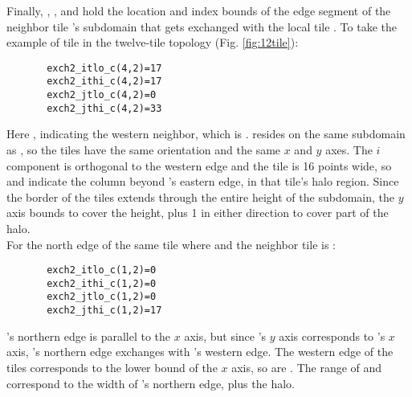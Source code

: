 Finally, ,
,
 and
 hold the location and index
bounds of the edge segment of the neighbor tile 's subdomain
that gets exchanged with the local tile .  To take the example
of tile  in the twelve-tile topology
(Fig. \ref{fig:12tile}): \\

\begin{verbatim}
       exch2_itlo_c(4,2)=17
       exch2_ithi_c(4,2)=17
       exch2_jtlo_c(4,2)=0
       exch2_jthi_c(4,2)=33
\end{verbatim}
 
Here , indicating the western neighbor, which is .
 resides on the same subdomain as , so the tiles
have the same orientation and the same $x$ and $y$ axes.  The $i$
component is orthogonal to the western edge and the tile is 16 points
wide, so  and  indicate the
column beyond 's eastern edge, in that tile's halo
region. Since the border of the tiles extends through the entire
height of the subdomain, the $y$ axis bounds  to
 cover the height, plus 1 in either direction to
cover part of the halo. \\

For the north edge of the same tile  where  and 
the neighbor tile is :

\begin{verbatim}
       exch2_itlo_c(1,2)=0
       exch2_ithi_c(1,2)=0
       exch2_jtlo_c(1,2)=0
       exch2_jthi_c(1,2)=17
\end{verbatim}
 
's northern edge is parallel to the $x$ axis, but since
's $y$ axis corresponds to 's $x$ axis,
's northern edge exchanges with 's western edge.
The western edge of the tiles corresponds to the lower bound of the
$x$ axis, so   are . The
range of  and  correspond to the
width of 's northern edge, plus the halo. \\











